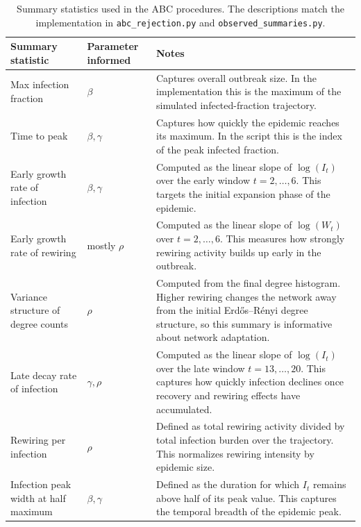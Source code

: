 \documentclass[11pt]{article}
\begin{document}
\begin{table}[H]
\centering
\caption{Summary statistics used in the ABC procedures. The descriptions match the implementation in \texttt{abc\_rejection.py} and \texttt{observed\_summaries.py}.}
\label{tab:summary-statistics-role}
\begin{tabular}{>{\raggedright\arraybackslash}p{} >{\raggedright\arraybackslash}p{} >{\raggedright\arraybackslash}p{}}
\toprule
Summary statistic & Parameter informed & Notes \\
\midrule
Max infection fraction & $\beta$ & Captures overall outbreak size. In the implementation this is the maximum of the simulated infected-fraction trajectory. \\
Time to peak & $\beta, \gamma$ & Captures how quickly the epidemic reaches its maximum. In the script this is the index of the peak infected fraction. \\
Early growth rate of infection & $\beta, \gamma$ & Computed as the linear slope of $\log(I_t)$ over the early window $t=2,\dots,6$. This targets the initial expansion phase of the epidemic. \\
Early growth rate of rewiring & mostly $\rho$ & Computed as the linear slope of $\log(W_t)$ over $t=2,\dots,6$. This measures how strongly rewiring activity builds up early in the outbreak. \\
Variance structure of degree counts & $\rho$ & Computed from the final degree histogram. Higher rewiring changes the network away from the initial Erd\H{o}s--R\'enyi degree structure, so this summary is informative about network adaptation. \\
Late decay rate of infection & $\gamma, \rho$ & Computed as the linear slope of $\log(I_t)$ over the late window $t=13,\dots,20$. This captures how quickly infection declines once recovery and rewiring effects have accumulated. \\
Rewiring per infection & $\rho$ & Defined as total rewiring activity divided by total infection burden over the trajectory. This normalizes rewiring intensity by epidemic size. \\
Infection peak width at half maximum & $\beta, \gamma$ & Defined as the duration for which $I_t$ remains above half of its peak value. This captures the temporal breadth of the epidemic peak. \\
\bottomrule
\end{tabular}
\end{table}
\end{document}
